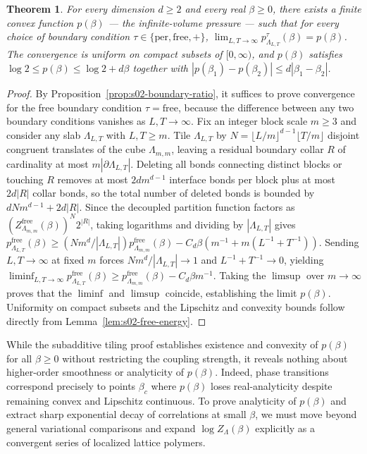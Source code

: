 \documentclass[11pt]{article}
\newtheorem{theorem}{Theorem}[section]
\theoremstyle{definition}
\begin{document}
\begin{theorem}
\label{thm:s02-thermo-limit}
For every dimension $d \ge 2$ and every real $\beta \ge 0$, there exists a finite
convex function $p(\beta)$ --- the \emph{infinite-volume pressure} --- such that for
every choice of boundary condition $\tau \in \{\mathrm{per}, \mathrm{free}, +\}$,
$\lim_{L, T \to \infty} p_{\Lambda_{L,T}}^\tau(\beta) = p(\beta)$. The convergence
is uniform on compact subsets of $[0, \infty)$, and $p(\beta)$ satisfies $\log 2 \le
p(\beta) \le \log 2 + d\beta$ together with $|p(\beta_1) - p(\beta_2)| \le d
|\beta_1 - \beta_2|$.
\end{theorem}
\begin{proof}
By Proposition~\ref{prop:s02-boundary-ratio}, it suffices to prove convergence for
the free boundary condition $\tau = \mathrm{free}$, because the difference between
any two boundary conditions vanishes as $L, T \to \infty$. Fix an integer block
scale $m \ge 3$ and consider any slab $\Lambda_{L,T}$ with $L, T \ge m$. Tile
$\Lambda_{L,T}$ by $N = \lfloor L/m \rfloor^{d-1} \lfloor T/m \rfloor$ disjoint
congruent translates of the cube $\Lambda_{m,m}$, leaving a residual boundary collar
$R$ of cardinality at most $m |\partial \Lambda_{L,T}|$. Deleting all bonds
connecting distinct blocks or touching $R$ removes at most $2d m^{d-1}$ interface
bonds per block plus at most $2d |R|$ collar bonds, so the total number of deleted
bonds is bounded by $d N m^{d-1} + 2d |R|$. Since the decoupled partition function
factors as $(Z_{\Lambda_{m,m}}^{\mathrm{free}}(\beta))^N 2^{|R|}$, taking logarithms
and dividing by $|\Lambda_{L,T}|$ gives $p_{\Lambda_{L,T}}^{\mathrm{free}}(\beta)
\ge (N m^d / |\Lambda_{L,T}|) p_{\Lambda_{m,m}}^{\mathrm{free}}(\beta) - C_d \beta
(m^{-1} + m (L^{-1} + T^{-1}))$. Sending $L, T \to \infty$ at fixed $m$ forces $N
m^d / |\Lambda_{L,T}| \to 1$ and $L^{-1} + T^{-1} \to 0$, yielding $\liminf_{L,T \to
\infty} p_{\Lambda_{L,T}}^{\mathrm{free}}(\beta) \ge
p_{\Lambda_{m,m}}^{\mathrm{free}}(\beta) - C_d \beta m^{-1}$. Taking the $\limsup$
over $m \to \infty$ proves that the $\liminf$ and $\limsup$ coincide, establishing
the limit $p(\beta)$. Uniformity on compact subsets and the Lipschitz and convexity
bounds follow directly from Lemma~\ref{lem:s02-free-energy}.
\end{proof}

While the subadditive tiling proof establishes existence and convexity of $p(\beta)$
for all $\beta \ge 0$ without restricting the coupling strength, it reveals nothing
about higher-order smoothness or analyticity of $p(\beta)$. Indeed, phase
transitions correspond precisely to points $\beta_c$ where $p(\beta)$ loses
real-analyticity despite remaining convex and Lipschitz continuous. To prove
analyticity of $p(\beta)$ and extract sharp exponential decay of correlations at
small $\beta$, we must move beyond general variational comparisons and expand $\log
Z_\Lambda(\beta)$ explicitly as a convergent series of localized lattice polymers.
\end{document}
